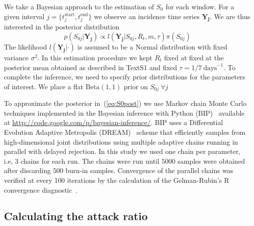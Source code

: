 We take a Bayesian approach to the estimation of $S_0$ for each window.
For a given interval $j = \{ t_j^{\text{start}}, t_j^{\text{end}} \} $ we 
observe an incidence time series $\mathbf{Y_{j}}$.
We are thus interested in the posterior distribution
\begin{equation}
 \label{eq:S0post}
 p(S_{0j}|\mathbf{Y_{j}}) \propto l(\mathbf{Y_{j}}|S_{0j}, R_t, m,  \tau 
)\pi(S_{0j}) 
\end{equation}
The likelihood $l(\mathbf{Y_{j}}|\cdot)$ is assumed to be a Normal distribution 
with fixed variance $\sigma^2$.
In this estimation procedure we kept $R_t$ fixed at fixed at the posterior mean 
obtained as described in TextS1 and fixed $\tau = 1/7\: \text{days}^{-1}$.
To complete the inference, we need to specify prior distributions for the 
parameters of interest.
We place a flat $\text{Beta}(1, 1)$ prior on $S_{0j}\:\forall j$
% 



To approximate the posterior in~(\ref{eq:S0post}) we use Markov chain Monte 
Carlo techniques implemented in the Bayesian inference with Python 
(BIP)~\cite{pone2011} available at 
\url{http://code.google.com/p/bayesian-inference/}.
BIP uses a Differential Evolution Adaptive Metropolis (DREAM)~\cite{vrugt2008} 
scheme that efficiently samples from high-dimensional joint distributions using 
multiple adaptive chains running in parallel with delayed rejection.
In this study we used one chain per parameter, i.e, 3 chains for each run.
The chains were run until $5000$ samples were obtained after discarding $500$ 
burn-in samples.
Convergence of the parallel chains was verified at every 100 iterations by the 
calculation of the Gelman-Rubin's R convergence diagnostic~\cite{brooks1998}.

\subsection*{Calculating the attack ratio}


